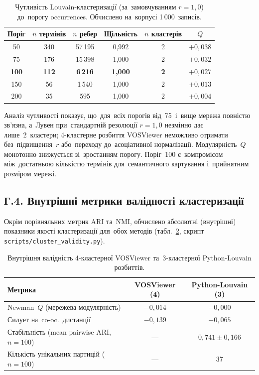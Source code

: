 \begin{table}[htbp]
\centering
\caption{Чутливість Louvain-кластеризації (за~замовчуванням $r=1{,}0$) до~порогу occurrences. Обчислено на~корпусі 1\,000~записів.}
\label{tab:threshold_sensitivity}
\footnotesize
\begin{tabular}{|c|c|c|c|c|c|}
\hline
\textbf{Поріг} & \textbf{$n$ термінів} & \textbf{$n$ ребер} & \textbf{Щільність} & \textbf{$n$ кластерів} & \textbf{$Q$} \\
\hline
50  & 340 & 57\,195 & 0,992 & 2 & $+0{,}038$ \\
\hline
75  & 176 & 15\,398 & 1,000 & 2 & $+0{,}032$ \\
\hline
\textbf{100} & \textbf{112} & \textbf{6\,216} & \textbf{1,000} & \textbf{2} & \textbf{$+0{,}027$} \\
\hline
150 & 56  & 1\,540 & 1,000 & 2 & $+0{,}013$ \\
\hline
200 & 35  & 595   & 1,000 & 2 & $+0{,}004$ \\
\hline
\end{tabular}
\end{table}

Аналіз чутливості показує, що~для~всіх порогів від~75~і~вище мережа повністю зв'язна, а~Лувен при~стандартній резолюції $r=1{,}0$ незмінно дає лише~2~кластери; 4-кластерне розбиття VOSViewer неможливо отримати без~підвищення~$r$ або~переходу до~асоціативної нормалізації. Модулярність~$Q$ монотонно знижується зі~зростанням порогу. Поріг~100 є~компромісом між~достатньою кількістю термінів для~семантичного картування і~прийнятним розміром мережі.

\subsection*{Г.4. Внутрішні метрики валідності кластеризації}
\label{app:bibliometric-validity}

Окрім порівняльних метрик ARI та~NMI, обчислено абсолютні (внутрішні) показники якості кластеризації для~обох методів (табл.~\ref{tab:cluster_validity}, скрипт \texttt{scripts/cluster\_validity.py}).

\begin{table}[htbp]
\centering
\caption{Внутрішня валідність 4-кластерної VOSViewer та~3-кластерної Python-Louvain розбиттів.}
\label{tab:cluster_validity}
\footnotesize
\begin{tabular}{|l|c|c|}
\hline
\textbf{Метрика} & \textbf{VOSViewer (4)} & \textbf{Python-Louvain (3)} \\
\hline
Newman~$Q$ (мережева модулярність) & $-0{,}014$ & $-0{,}000$ \\
\hline
Силует на~co-oc.\ дистанції & $-0{,}139$ & $-0{,}065$ \\
\hline
Стабільність (mean pairwise ARI, $n=100$) & --- & $0{,}741 \pm 0{,}166$ \\
\hline
Кількість унікальних партицій ($n=100$) & --- & 37 \\
\hline
\end{tabular}
\end{table}

